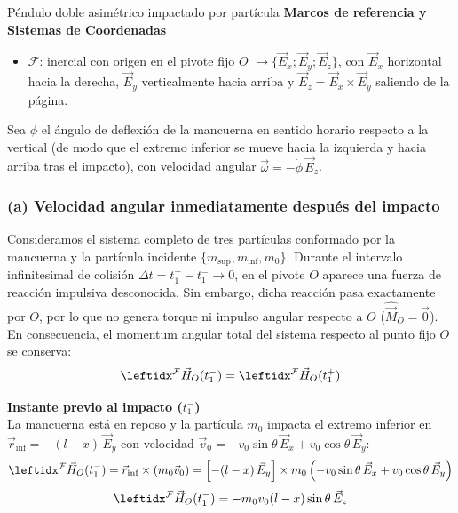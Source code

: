 \begin{solucion}{Péndulo doble asimétrico impactado por partícula}
\textbf{Marcos de referencia y Sistemas de Coordenadas}
\begin{itemize}
    \item $\mathcal{F}$: inercial con origen en el pivote fijo $O$ $\longrightarrow\{\vec{E}_x;\vec{E}_y;\vec{E}_z\}$, con $\vec{E}_x$ horizontal hacia la derecha, $\vec{E}_y$ verticalmente hacia arriba y $\vec{E}_z=\vec{E}_x\times\vec{E}_y$ saliendo de la página.
\end{itemize}
Sea $\phi$ el ángulo de deflexión de la mancuerna en sentido horario respecto a la vertical (de modo que el extremo inferior se mueve hacia la izquierda y hacia arriba tras el impacto), con velocidad angular $\vec{\omega} = -\dot{\phi}\,\vec{E}_z$.

\subsubsection*{(a) Velocidad angular inmediatamente después del impacto}
Consideramos el sistema completo de tres partículas conformado por la mancuerna y la partícula incidente $\{m_{\text{sup}}, m_{\text{inf}}, m_0\}$. Durante el intervalo infinitesimal de colisión $\Delta t = t_1^+ - t_1^- \to 0$, en el pivote $O$ aparece una fuerza de reacción impulsiva desconocida. Sin embargo, dicha reacción pasa exactamente por $O$, por lo que no genera torque ni impulso angular respecto a $O$ ($\hat{\vec{M}}_O = \vec{0}$). En consecuencia, el momentum angular total del sistema respecto al punto fijo $O$ se conserva:
$$\marc{\vec{H}_O(t_1^-)}{F}{} = \marc{\vec{H}_O(t_1^+)}{F}{}$$

\textbf{Instante previo al impacto ($t_1^-$)}\\
La mancuerna está en reposo y la partícula $m_0$ impacta el extremo inferior en $\vec{r}_{\text{inf}} = -(l - x)\,\vec{E}_y$ con velocidad $\vec{v}_0 = -v_0\sin\theta\,\vec{E}_x + v_0\cos\theta\,\vec{E}_y$:
$$\marc{\vec{H}_O(t_1^-)}{F}{} = \vec{r}_{\text{inf}} \times (m_0\vec{v}_0) = \left[-(l - x)\,\vec{E}_y\right] \times m_0\left(-v_0\sin\theta\,\vec{E}_x + v_0\cos\theta\,\vec{E}_y\right)$$
$$\marc{\vec{H}_O(t_1^-)}{F}{}= -m_0 v_0 (l - x)\sin\theta\,\vec{E}_z$$


\end{solucion}
